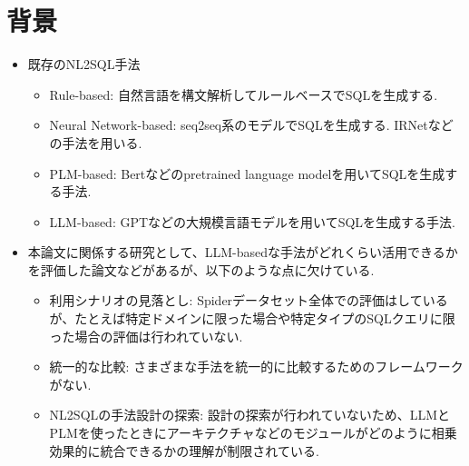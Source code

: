 \documentclass[dvipdfmx,uplatex]{jsarticle}
\theoremstyle{remark}
\newenvironment{simplebox}{
    \begin{tcolorbox}[
        fonttitle=\bfseries,
    ]
}{
    \end{tcolorbox}
}
\begin{document}
\section{背景}
\begin{simplebox}
\begin{itemize}
    \item 既存のNL2SQL手法
    \begin{itemize}
        \item Rule-based: 自然言語を構文解析してルールベースでSQLを生成する.
        \item Neural Network-based: seq2seq系のモデルでSQLを生成する. IRNetなどの手法を用いる.
        \item PLM-based: Bertなどのpretrained language modelを用いてSQLを生成する手法.
        \item LLM-based: GPTなどの大規模言語モデルを用いてSQLを生成する手法.
    \end{itemize}
    \item 本論文に関係する研究として、LLM-basedな手法がどれくらい活用できるかを評価した論文などがあるが、以下のような点に欠けている.
    \begin{itemize}
        \item 利用シナリオの見落とし: Spiderデータセット全体での評価はしているが、たとえば特定ドメインに限った場合や特定タイプのSQLクエリに限った場合の評価は行われていない.
        \item 統一的な比較: さまざまな手法を統一的に比較するためのフレームワークがない.
        \item NL2SQLの手法設計の探索: 設計の探索が行われていないため、LLMとPLMを使ったときにアーキテクチャなどのモジュールがどのように相乗効果的に統合できるかの理解が制限されている.
    \end{itemize}
\end{itemize}
\end{simplebox}
\end{document}
